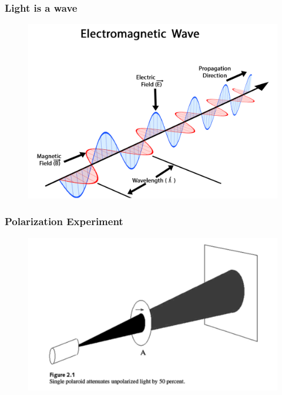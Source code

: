 \documentclass{beamer}
\begin{document}
\begin{frame}
\frametitle{Light is a wave}
\begin{figure}
\centering
\includegraphics[width=\textheight,trim={0 0 0 190},clip]{light.png}
\label{polar1}
\end{figure}
\end{frame}

\begin{frame}
\frametitle{Polarization Experiment}
\begin{figure}
\centering
\includegraphics[width=\textwidth]{polar1.png}
\label{polar1}
\end{figure}
\end{frame}
\end{document}
